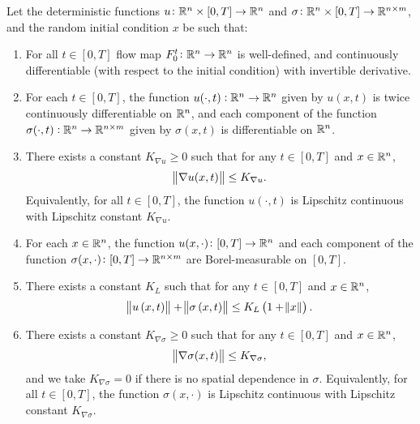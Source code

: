 \renewcommand\thehypo{H}
\begin{hypo}\label{hyp:smooth}
	Let the deterministic functions \(u \colon \mathbb{R}^n\times [0,T] \to \mathbb{R}^n\) and \(\sigma \colon \mathbb{R}^n \times [0,T] \to \mathbb{R}^{n\times m}\), and the random initial condition \(x\) be such that:
	\begin{enumerate}[label=(H.\arabic{*}), ref=H.\arabic{*}]
		\item\label{hyp:fm_exists} For all \(t \in [0,T]\) flow map \(F_0^t \colon \mathbb{R}^n \to \mathbb{R}^n\) is well-defined, and continuously differentiable (with respect to the initial condition) with invertible derivative.

		\item\label{hyp:coef_cont} For each \(t \in [0,T]\), the function \(u(\cdot, t): \mathbb{R}^n \to \mathbb{R}^n\) given by \(u(x,t)\) is twice continuously differentiable on \(\mathbb{R}^n\), and each component of the function \(\sigma(\cdot, t): \mathbb{R}^n \to \mathbb{R}^{n\times m}\) given by \(\sigma(x,t)\) is differentiable on \(\mathbb{R}^n\).

		\item\label{hyp:u_bounds} There exists a constant \(K_{\nabla u} \geq 0\) such that for any \(t \in [0,T]\) and \(x \in \mathbb{R}^n\),
		\begin{equation*}
			\norm{\nabla u(x,t)} \leq K_{\nabla u}.
		\end{equation*}
		Equivalently, for all \(t \in [0,T]\), the function \(u\!\left(\cdot, t\right)\) is Lipschitz continuous with Lipschitz constant \(K_{\nabla u}\).

		\item\label{hyp:coef_meas} For each \(x \in \mathbb{R}^n\), the function \(u(x,\cdot) \colon [0,T] \to \mathbb{R}^n\) and each component of the function \(\sigma(x,\cdot) \colon [0,T] \to \mathbb{R}^{n\times m}\) are Borel-measurable on \([0,T]\).

		\item\label{hyp:linear_growth} There exists a constant \(K_L\) such that for any \(t \in [0,T]\) and \(x \in \mathbb{R}^n\),
		\[
			\norm{u\left(x,t\right)} + \norm{\sigma\left(x,t\right)} \leq K_L\left(1 + \norm{x}\right).
		\]

		\item\label{hyp:sigma_deriv_bound} There exists a constant \(K_{\nabla\sigma} \geq 0\) such that for any \(t \in [0,T]\) and \(x \in \mathbb{R}^n\),
		\begin{equation*}
			\norm{\nabla\sigma(x,t)} \leq K_{\nabla\sigma},
		\end{equation*}
		and we take \(K_{\nabla\sigma} = 0\) if there is no spatial dependence in \(\sigma\).
		Equivalently, for all \(t \in [0,T]\), the function \(\sigma\!\left(x, \cdot\right)\) is Lipschitz continuous with Lipschitz constant \(K_{\nabla\sigma}\).


\end{enumerate}
\end{hypo}
